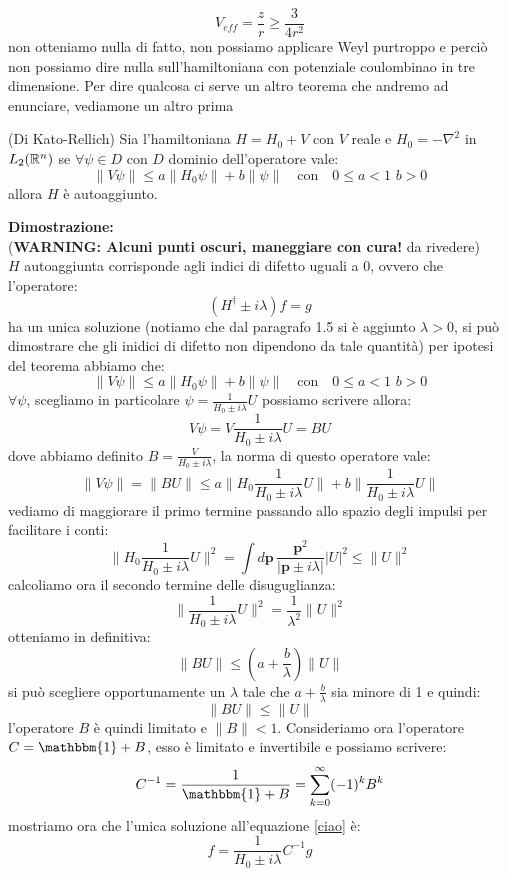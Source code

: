 \[V_{eff} = \frac{z}{r}\geq \frac{3}{4r^2}\]
non otteniamo nulla di fatto, non possiamo applicare Weyl purtroppo e perciò non possiamo dire nulla sull'hamiltoniana con potenziale coulombinao in tre dimensione. Per dire qualcosa ci serve un altro teorema che andremo ad enunciare, vediamone un altro prima
\begin{thm}
(Di Kato-Rellich) Sia l'hamiltoniana $H =H_0 +V$ con $V$ reale e $H_0 = -\nabla^2$ in $L_2(\mathbb{R}^n)$ se $\forall \psi\in D$ con $D$ dominio dell'operatore vale:
\[\|V\psi\|\leq a\|H_0\psi\|+b\|\psi\|\quad\text{con}\quad 0\leq a<1\,\, b>0\]
allora $H$ è autoaggiunto.
\end{thm}
\hspace{-1.6em}\textbf{Dimostrazione:}\\(\textbf{WARNING: Alcuni punti oscuri, maneggiare con cura!} da rivedere)\\
$H$ autoaggiunta corrisponde agli indici di difetto uguali a 0, ovvero che l'operatore:
\begin{equation}\label{ciao}(H^\dagger \pm i\lambda)f=g\end{equation}
ha un unica soluzione (notiamo che dal paragrafo 1.5 si è aggiunto $\lambda>0$, si può dimostrare che gli inidici di difetto non dipendono da tale quantità)
per ipotesi del teorema abbiamo che:
\[\|V\psi\|\leq a\|H_0\psi\|+b\|\psi\|\quad\text{con}\quad 0\leq a<1\,\, b>0\]
$\forall \psi$, scegliamo in particolare $\psi = \frac{1}{H_0\pm i \lambda} U$ possiamo scrivere allora:
\[V\psi = V\frac{1}{H_0\pm i \lambda} U = BU\]
dove abbiamo definito $B = \frac{V}{H_0\pm i \lambda}$, la norma di questo operatore vale:
\[\|V\psi\| = \|BU\| \leq a\|H_0\frac{1}{H_0\pm i \lambda}U\| + b\|\frac{1}{H_0\pm i \lambda}U\|\]
vediamo di maggiorare il primo termine passando allo spazio degli impulsi per facilitare i conti:
\[\|H_0\frac{1}{H_0\pm i \lambda}U\|^2 = \int d\mathbf{p}\, \frac{\mathbf{p}^2}{|\mathbf{p} \pm i\lambda|}|U|^2 \leq \|U\|^2\]
calcoliamo ora il secondo termine delle disuguglianza:
\[\|\frac{1}{H_0\pm i \lambda}U\|^2 = \frac{1}{\lambda^2}\|U\|^2\]
otteniamo in definitiva:
\[ \|BU\|  \leq (a+\frac{b}{\lambda})\|U\|\]
si può scegliere opportunamente un $\lambda$ tale che $a+\frac{b}{\lambda}$ sia minore di 1 e quindi:
\[ \|BU\| \leq \|U\|\]
l'operatore $B$ è quindi limitato e $\|B\|<1$. Consideriamo ora l'operatore $C = \mathbbm{1} + B$, esso è limitato e invertibile e possiamo scrivere:
\[C^{-1} = \frac{1}{\mathbbm{1}+B} = \sum_{k=0}^\infty (-1)^k B^k\]
mostriamo ora che l'unica soluzione all'equazione \eqref{ciao} è:
\[f = \frac{1}{H_0\pm i\lambda}C^{-1}g\]
